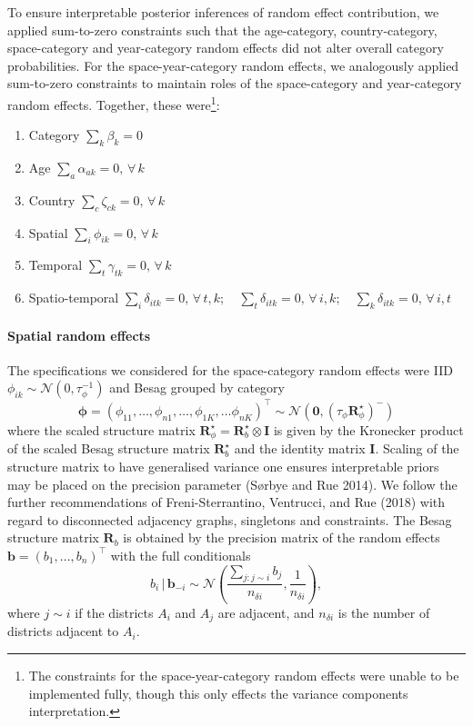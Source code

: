 \documentclass[
]{article}
\newcommand{\N}{\mathcal{N}}
\newcommand{\bphi}{\bm{\phi}}
\begin{document}
To ensure interpretable posterior inferences of random effect
contribution, we applied sum-to-zero constraints such that the
age-category, country-category, space-category and year-category random
effects did not alter overall category probabilities. For the
space-year-category random effects, we analogously applied sum-to-zero
constraints to maintain roles of the space-category and year-category
random effects. Together, these
were\footnote{The constraints for the space-year-category random effects were unable to be implemented fully, though this only effects the variance components interpretation.}:

\begin{enumerate}
    \item Category $\sum_k \beta_k = 0$
    \item Age $\sum_a \alpha_{ak} = 0, \, \forall \, k$
    \item Country $\sum_c \zeta_{ck} = 0, \, \forall \, k$
    \item Spatial $\sum_i \phi_{ik} = 0, \, \forall \, k$
    \item Temporal $\sum_t \gamma_{tk} = 0, \, \forall \, k$
    \item Spatio-temporal $\sum_i \delta_{itk} = 0, \, \forall \, t, k;
\quad \sum_t \delta_{itk} = 0, \, \forall \, i, k;
\quad \sum_k \delta_{itk} = 0, \, \forall \, i, t$
\end{enumerate}

\hypertarget{spatial-random-effects}{%
\paragraph{\texorpdfstring{Spatial random effects
\label{sec:spatial-random-effects}}{Spatial random effects }}\label{spatial-random-effects}}

The specifications we considered for the space-category random effects
were IID \(\phi_{ik} \sim \mathcal{N}(0, \tau_\phi^{-1})\) and Besag
grouped by category \[
\bphi = (\phi_{11}, \ldots, \phi_{n1}, \ldots, \phi_{1K}, \ldots \phi_{nK})^\top \sim \mathcal{N}(\mathbf{0}, (\tau_\phi \mathbf{R}^\star_\phi)^{-})
\] where the scaled structure matrix
\(\mathbf{R}^\star_\phi = \mathbf{R}^\star_b \otimes \mathbf{I}\) is
given by the Kronecker product of the scaled Besag structure matrix
\(\mathbf{R}^\star_b\) and the identity matrix \(\mathbf{I}\). Scaling
of the structure matrix to have generalised variance one ensures
interpretable priors may be placed on the precision parameter (Sørbye
and Rue 2014). We follow the further recommendations of
Freni-Sterrantino, Ventrucci, and Rue (2018) with regard to disconnected
adjacency graphs, singletons and constraints. The Besag structure matrix
\(\mathbf{R}_b\) is obtained by the precision matrix of the random
effects \(\mathbf{b} = (b_1, \ldots, b_n)^\top\) with the full
conditionals \begin{equation}
b_i \, | \, \mathbf{b}_{-i} \sim \N\left(\frac{\sum_{j: j \sim i} b_j}{n_{\delta i}}, \frac{1}{n_{\delta i}}\right),
\end{equation} where \(j \sim i\) if the districts \(A_i\) and \(A_j\)
are adjacent, and \(n_{\delta i}\) is the number of districts adjacent
to \(A_i\).
\end{document}
